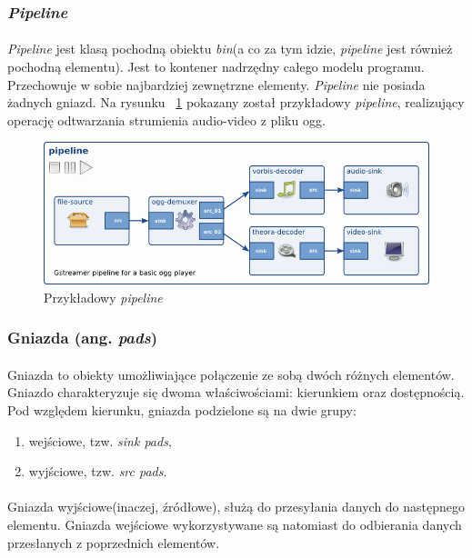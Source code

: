 \documentclass{article}
\begin{document}
\subsubsection{\textit{Pipeline}}
\paragraph{}
\textit{Pipeline} jest klasą pochodną obiektu \textit{bin}(a co za tym idzie, \textit{pipeline} jest również pochodną elementu). Jest to kontener nadrzędny całego modelu programu. Przechowuje w sobie najbardziej zewnętrzne elementy. \textit{Pipeline} nie posiada żadnych gniazd. Na rysunku ~\ref{fig:samplePipeline} pokazany został przykładowy \textit{pipeline}, realizujący operację odtwarzania strumienia audio-video z pliku ogg.
\begin{figure}[H]
  \includegraphics[width=150mm]{img/simple-player.png}
  \caption{Przykładowy \textit{pipeline}}
  \label{fig:samplePipeline}
\end{figure}
\subsubsection{Gniazda (ang. \textit{pads})}
\paragraph{}
Gniazda to obiekty umożliwiające połączenie ze sobą dwóch różnych elementów. Gniazdo charakteryzuje się dwoma właściwościami: kierunkiem oraz dostępnością. Pod względem kierunku, gniazda podzielone są na dwie grupy:
\begin{enumerate}
  \item wejściowe, tzw. \textit{sink pads},
  \item wyjściowe, tzw. \textit{src pads}.
\end{enumerate}
\paragraph{}
Gniazda wyjściowe(inaczej, źródłowe), służą do przesyłania danych do następnego elementu. Gniazda wejściowe wykorzystywane są natomiast do odbierania danych przesłanych z poprzednich elementów.
\end{document}
